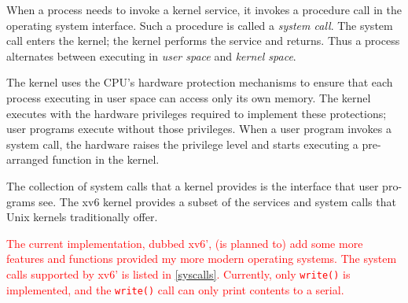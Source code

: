 \documentclass{report}
\begin{document}
	When a process needs to invoke a kernel service, it invokes a procedure call in
	the operating system interface. Such a procedure is called a \emph{system call}. The system
	call enters the kernel; the kernel performs the service and returns. Thus a process
	alternates between executing in \emph{user space} and \emph{kernel space}.
	
	The kernel uses the CPU's hardware protection mechanisms to ensure that each
	process executing in user space can access only its own memory. The kernel executes
	with the hardware privileges required to implement these protections; user programs
	execute without those privileges. When a user program invokes a system call, the
	hardware raises the privilege level and starts executing a pre-arranged function in the
	kernel.
	
	The collection of system calls that a kernel provides is the interface that user pro-
	grams see. The xv6 kernel provides a subset of the services and system calls that Unix
	kernels traditionally offer.
	
	\textcolor{red}{
		The current implementation, dubbed xv6', (is planned to) add some more features and
		functions provided my more modern operating systems. The system calls supported by xv6'
		is listed in \figurename{\ref{syscalls}}.  Currently, only \texttt{write()} is implemented,
		and the \texttt{write()} call can only print contents to a serial.
	}
	
\end{document}
